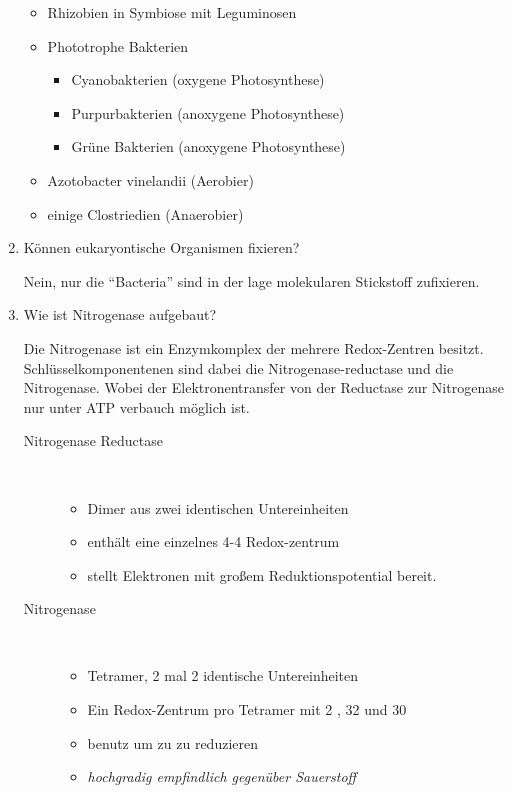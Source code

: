 \begin{enumerate}
		\begin{itemize}
			\item Rhizobien in Symbiose mit Leguminosen
			\item Phototrophe Bakterien 
				\begin{itemize}
					\item Cyanobakterien 	\hfill (oxygene Photosynthese)
					\item Purpurbakterien 	\hfill (anoxygene Photosynthese)
					\item Grüne Bakterien 	\hfill (anoxygene Photosynthese)
				\end{itemize}
			\item Azotobacter vinelandii 	\hfill(Aerobier)
			\item einige Clostriedien		\hfill(Anaerobier)
		\end{itemize}

	\item Können eukaryontische Organismen  fixieren?
		
		Nein, nur die ``Bacteria'' sind in der lage molekularen Stickstoff zufixieren.

	\item Wie ist Nitrogenase aufgebaut?
		
		Die Nitrogenase ist ein Enzymkomplex der mehrere Redox-Zentren besitzt.
		Schlüsselkomponentenen sind dabei die Nitrogenase-reductase und die Nitrogenase.
		Wobei der Elektronentransfer von der Reductase zur Nitrogenase nur unter ATP verbauch möglich ist.

		\begin{description}
			\item[Nitrogenase Reductase] \hfill \\
				\begin{itemize}
					\item Dimer aus zwei identischen Untereinheiten
					\item enthält eine einzelnes 4-4 Redox-zentrum
					\item stellt Elektronen mit großem Reduktionspotential bereit.
				\end{itemize}
			\item[Nitrogenase] \hfill \\
				\begin{itemize}
					\item Tetramer, 2 mal 2 identische Untereinheiten
					\item Ein Redox-Zentrum pro Tetramer mit 2 , 32  und 30 
					\item benutz  um  zu  zu reduzieren
					\item \slshape{hochgradig empfindlich gegenüber Sauerstoff}
				\end{itemize}
		\end{description}


\end{enumerate}
